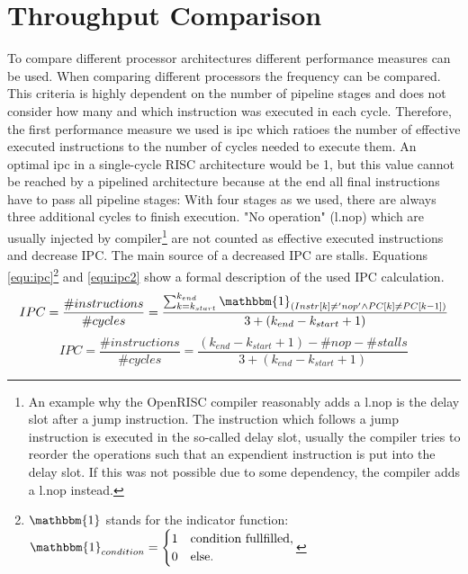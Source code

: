\section{Throughput Comparison}
To compare different processor architectures different performance measures can be used. When comparing different processors the frequency can be compared. This criteria is highly dependent on the number of pipeline stages and does not consider how many and which instruction was executed in each cycle.
Therefore, the first performance measure we used is \gls{ipc} which ratioes the number of effective executed instructions to the number of cycles needed to execute them. An optimal \gls{ipc} in a single-cycle RISC architecture would be 1, but this value cannot be reached by a pipelined architecture because at the end all final instructions have to pass all pipeline stages: With four stages as we used, there are always three additional cycles to finish execution. "No operation" (l.nop) which are usually injected by compiler\footnote{An example why the OpenRISC compiler reasonably adds a l.nop is the delay slot after a jump instruction. The instruction which follows a jump instruction is executed in the so-called delay slot, usually the compiler tries to reorder the operations such that an expendient instruction is put into the delay slot. If this was not possible due to some dependency, the compiler adds a l.nop instead.} are not counted as effective executed instructions and decrease IPC. The main source of a decreased IPC are stalls. Equations \ref{equ:ipc}\footnote{$\mathbbm{1}$ stands for the indicator function: $\mathbbm{1}_{condition}=\begin{cases}
								1 & \text{condition fullfilled},\\
								0 & \text{else}.
							    \end{cases}$} and \ref{equ:ipc2} show a formal description of the used IPC calculation.
\begin{equation}
\label{equ:ipc} 
IPC=\frac{\#instructions}{\#cycles}=\frac{\sum_{k=k_{start}}^{k_{end}} \mathbbm{1}_{(Instr[k]\ne'nop' \wedge PC[k]\ne PC[k-1])}}{3+(k_{end}-k_{start}+1)}
\end{equation}
\begin{equation}
\label{equ:ipc2} 
IPC=\frac{\#instructions}{\#cycles}=\frac{(k_{end}-k_{start}+1)-\#nop-\#stalls}{3+(k_{end}-k_{start}+1)} 
\end{equation}

